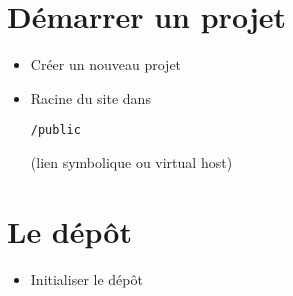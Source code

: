 \begin{otherlanguage}{english}

\begin{Shaded}
\begin{Highlighting}[]
 
\end{Highlighting}
\end{Shaded}

\end{otherlanguage}

\hypertarget{duxe9marrer-un-projet}{%
\section{Démarrer un projet}\label{duxe9marrer-un-projet}}

\begin{itemize}
\tightlist
\item
  Créer un nouveau projet
\end{itemize}

\begin{otherlanguage}{english}

\begin{Shaded}
\begin{Highlighting}[]
\NormalTok{$ }
\NormalTok{$ }
\NormalTok{$ }
\end{Highlighting}
\end{Shaded}

\end{otherlanguage}

\begin{itemize}
\tightlist
\item
  Racine du site dans
  \begin{otherlanguage}{english}\texttt{/public}\end{otherlanguage}
  (lien symbolique ou virtual host)
\end{itemize}

\hypertarget{le-duxe9puxf4t}{%
\section{Le dépôt}\label{le-duxe9puxf4t}}

\begin{itemize}
\tightlist
\item
  Initialiser le dépôt
\end{itemize}


